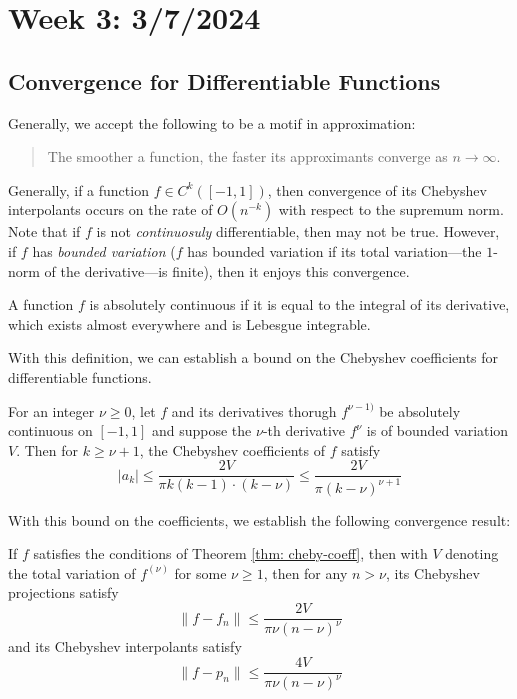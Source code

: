 \section{Week 3: 3/7/2024}
\subsection{Convergence for Differentiable Functions}
Generally, we accept the following to be a motif in approximation:
\begin{quote}
  The smoother a function, the faster its approximants converge as $n \rightarrow \infty$. 
\end{quote}
Generally, if a function $f \in C^k([-1, 1])$, then convergence of its Chebyshev interpolants occurs on the rate of $O(n^{-k})$ with respect to the supremum norm. Note that if $f$ is not \emph{continuosuly} differentiable, then may not be true. However, if $f$ has \emph{bounded variation} ($f$ has bounded variation if its total variation---the $1$-norm of the derivative---is finite), then it enjoys this convergence. 
\begin{dfn}
    A function $f$ is absolutely continuous if it is equal to the integral of its derivative, which exists almost everywhere and is Lebesgue integrable. 
\end{dfn}
With this definition, we can establish a bound on the Chebyshev coefficients for differentiable functions.
\begin{theorem}
  For an integer $\nu \geq 0$, let $f$ and its derivatives thorugh $f^{\nu - 1)}$ be absolutely continuous on $[-1, 1]$ and suppose the $\nu$-th derivative $f^\nu$ is of bounded variation $V$. Then for $k \geq \nu + 1$, the Chebyshev coefficients of $f$ satisfy
  \[ |a_k| \leq \frac{2V}{\pi k(k -1)\cdot(k - \nu)} \leq \frac{2V}{\pi(k-\nu)^{\nu + 1}}\]
  \label{thm: cheby-coeff}
\end{theorem}
With this bound on the coefficients, we establish the following convergence result:
\begin{theorem}
  If $f$ satisfies the conditions of Theorem \ref{thm: cheby-coeff}, then with $V$ denoting the total variation of $f^{(\nu)}$ for some $\nu \geq 1$, then for any $n > \nu$, its Chebyshev projections satisfy
  \[ \|f - f_n\| \leq \frac{2V}{\pi \nu (n-\nu)^\nu} \]
  and its Chebyshev interpolants satisfy
  \[ \| f - p_n\| \leq \frac{4V}{\pi\nu(n-\nu)^\nu}\]
\end{theorem}

